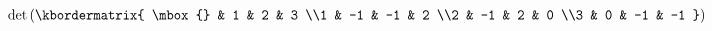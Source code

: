 \documentclass[10pt]{article}
\begin{document}
\begin{align*}\det{
  \left(
  \kbordermatrix{
    \mbox{} & 1 & 2 & 3
    \\1 & -1 & -1 & 2
    \\2 & -1 & 2 & 0
    \\3 & 0 & -1 & -1
  }
  \right)
}\end{align*}
\end{document}
